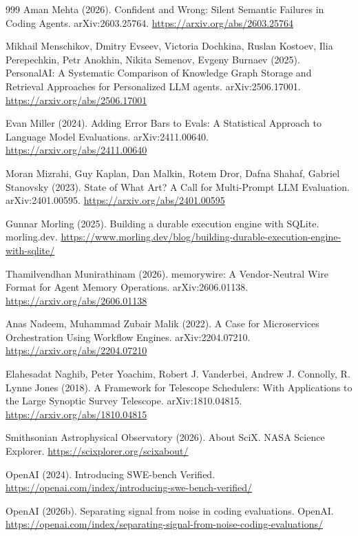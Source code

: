 \begin{thebibliography}{999}
 Aman Mehta (2026). Confident and Wrong: Silent Semantic Failures in Coding Agents. arXiv:2603.25764. \url{https://arxiv.org/abs/2603.25764}

 Mikhail Menschikov, Dmitry Evseev, Victoria Dochkina, Ruslan Kostoev, Ilia Perepechkin, Petr Anokhin, Nikita Semenov, Evgeny Burnaev (2025). PersonalAI: A Systematic Comparison of Knowledge Graph Storage and Retrieval Approaches for Personalized LLM agents. arXiv:2506.17001. \url{https://arxiv.org/abs/2506.17001}

 Evan Miller (2024). Adding Error Bars to Evals: A Statistical Approach to Language Model Evaluations. arXiv:2411.00640. \url{https://arxiv.org/abs/2411.00640}

 Moran Mizrahi, Guy Kaplan, Dan Malkin, Rotem Dror, Dafna Shahaf, Gabriel Stanovsky (2023). State of What Art? A Call for Multi-Prompt LLM Evaluation. arXiv:2401.00595. \url{https://arxiv.org/abs/2401.00595}

 Gunnar Morling (2025). Building a durable execution engine with SQLite. morling.dev. \url{https://www.morling.dev/blog/building-durable-execution-engine-with-sqlite/}

 Thamilvendhan Munirathinam (2026). memorywire: A Vendor-Neutral Wire Format for Agent Memory Operations. arXiv:2606.01138. \url{https://arxiv.org/abs/2606.01138}

 Anas Nadeem, Muhammad Zubair Malik (2022). A Case for Microservices Orchestration Using Workflow Engines. arXiv:2204.07210. \url{https://arxiv.org/abs/2204.07210}

 Elahesadat Naghib, Peter Yoachim, Robert J. Vanderbei, Andrew J. Connolly, R. Lynne Jones (2018). A Framework for Telescope Schedulers: With Applications to the Large Synoptic Survey Telescope. arXiv:1810.04815. \url{https://arxiv.org/abs/1810.04815}

 Smithsonian Astrophysical Observatory (2026). About SciX. NASA Science Explorer. \url{https://scixplorer.org/scixabout/}

 OpenAI (2024). Introducing SWE-bench Verified. \url{https://openai.com/index/introducing-swe-bench-verified/}

 OpenAI (2026b). Separating signal from noise in coding evaluations. OpenAI. \url{https://openai.com/index/separating-signal-from-noise-coding-evaluations/}


\end{thebibliography}
